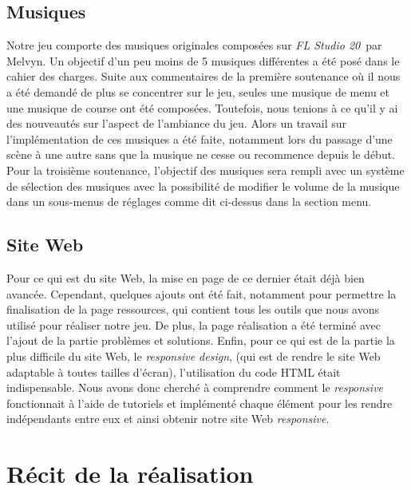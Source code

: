 \documentclass[12pt,a4paper]{article}
\newcommand{\FL}{\textsl{FL Studio 20}}
\begin{document}
        \subsection{Musiques}
            Notre jeu comporte des musiques originales composées sur \FL\, par Melvyn. Un objectif d'un 
            peu moins de 5 musiques différentes a été posé dans le cahier des charges. Suite aux 
            commentaires de la première soutenance où il nous a été demandé de plus se concentrer sur le
            jeu, seules une musique de menu et une musique de course ont été composées. Toutefois, nous 
            tenions à ce qu'il y ai des nouveautés sur l'aspect de l'ambiance du jeu. Alors un travail 
            sur l'implémentation de ces musiques a été faite, notamment lors du passage d'une scène à
            une autre sans que la musique ne cesse ou recommence depuis le début. Pour la troisième 
            soutenance, l'objectif des musiques sera rempli avec un système de sélection des musiques 
            avec la possibilité de modifier le volume de la musique dans un sous-menus de réglages comme
            dit ci-dessus dans la section menu.

        \clearpage
        
        \subsection{Site Web}
            Pour ce qui est du site Web, la mise en page de ce dernier était déjà bien avancée. 
            Cependant, quelques ajouts ont été fait, notamment pour permettre la finalisation de la 
            page ressources, qui contient tous les outils que nous avons utilisé pour réaliser notre 
            jeu. De plus, la page réalisation a été terminé avec l'ajout de la partie 
            problèmes et solutions.
            Enfin, pour ce qui est de la partie la plus difficile du site Web, le \textit{responsive 
            design}, (qui est de rendre le site Web adaptable à toutes tailles d'écran), l'utilisation 
            du code HTML était indispensable. Nous avons donc cherché à comprendre comment le 
            \textit{responsive} fonctionnait à l'aide de tutoriels et implémenté chaque élément 
            pour les rendre indépendants entre eux et ainsi obtenir notre site Web \textit{responsive}.


    \clearpage
    \section{Récit de la réalisation}
\end{document}
